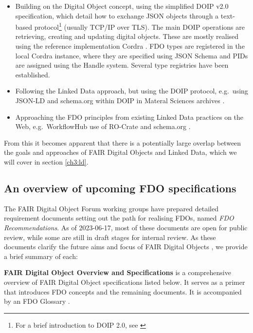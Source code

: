 \begin{itemize}
\tightlist
\item
  Building on the Digital Object concept, using the simplified DOIP v2.0 \cite{DONA 2018} specification, which detail how to exchange \gls{JSON} objects through a text-based protocol\footnote{For a brief introduction to DOIP 2.0, see \cite{CNRI 2023b}} (usually TCP/IP over TLS). The main DOIP operations are retrieving, creating and updating digital objects. These are mostly realised using the reference implementation Cordra \cite{Tupelo-Scheck 2022}. FDO types are registered in the local Cordra instance, where they are specified using JSON Schema \cite{Wright 2022} and PIDs are assigned using the Handle system. Several type registries have been established.
\item
  Following the Linked Data approach, but using the DOIP protocol, e.g.~using \gls{JSON-LD} and schema.org within DOIP in Materal Sciences archives \cite{Riccardi 2022}.
\item
  Approaching the FDO principles from existing Linked Data practices on the Web, e.g.~WorkflowHub use of RO-Crate and schema.org \cite{Soiland-Reyes 2022c}.
\end{itemize}

From this it becomes apparent that there is a potentially large overlap between the goals and approaches of FAIR Digital Objects and Linked Data, which we will cover in section \vref{ch3:ld}.


\subsection{An overview of upcoming FDO specifications}\label{ch3:next-step-fdo}

The FAIR Digital Object Forum \cite{FAIRDigitalObjects} working groups have prepared detailed requirement documents \cite{FDO Specs} setting out the path for realising FDOs, named \emph{FDO Recommendations}. As of 2023-06-17, most of these documents are open for public review, while some are still in draft stages for internal review. As these documents clarify the future aims and focus of FAIR Digital Objects \cite{Lannom 2022b}, we provide a brief summary of each:

\textbf{FAIR Digital Object Overview and Specifications} \cite{Ivonne 2023} is a comprehensive overview of FAIR Digital Object specifications listed below. It serves as a primer that introduces FDO concepts and the remaining documents. It is accompanied by an FDO Glossary \cite{Broeder 2022}.

